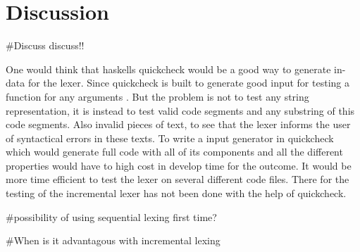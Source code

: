 \chapter{Discussion}
\#Discuss discuss!!

One would think that haskells quickcheck would be a good way to generate in-data
for the lexer. Since quickcheck is built to generate good input for testing a
function for any arguments \cite{QuickCheck}. But the problem is not to test any
string representation, it is instead to test valid code segments and any
substring of this code segments. Also invalid pieces of text, to see that the
lexer informs the user of syntactical errors in these texts. To write a input
generator in quickcheck which would generate full code with all of its
components and all the different properties would have to high cost in
develop time for the outcome. It would be more time efficient to test the lexer
on several different code files. There for the testing of the incremental lexer
has not been done with the help of quickcheck.

\#possibility of using sequential lexing first time?

\#When is it advantagous with incremental lexing
